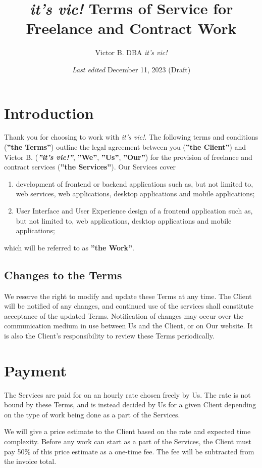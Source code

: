 \documentclass{article}
\title{\textit{it's vic!} Terms of Service for Freelance and Contract Work}
\author{Victor B. DBA \textit{it's vic!}}
\date{\textit{Last edited} December 11, 2023 (Draft)}
\begin{document}
\maketitle
\tableofcontents

\renewcommand{\labelenumi}{\alph{enumi})}

\section{Introduction}
Thank you for choosing to work with \textit{it's vic!}. The following terms and conditions (\textbf{''the Terms''}) outline the legal agreement between you (\textbf{''the Client''}) and Victor B. (\textbf{\textit{''it's vic!''}}, \textbf{''We''}, \textbf{''Us''}, \textbf{''Our''}) for the provision of freelance and contract services (\textbf{''the Services''}). Our Services cover 
\begin{enumerate}
    \item development of frontend or backend applications such as, but not limited to, web services, web applications, desktop applications and mobile applications;
    \item User Interface and User Experience design of a frontend application such as, but not limited to, web applications, desktop applications and mobile applications;
\end{enumerate}
which will be referred to as \textbf{''the Work''}.

\subsection{Changes to the Terms}
We reserve the right to modify and update these Terms at any time. The Client will be notified of any changes, and continued use of the services shall constitute acceptance of the updated Terms. Notification of changes may occur over the communication medium in use between Us and the Client, or on Our website. It is also the Client's responsibility to review these Terms periodically.

\section{Payment}
The Services are paid for on an hourly rate chosen freely by Us. The rate is not bound by these Terms, and is instead decided by Us for a given Client depending on the type of work being done as a part of the Services.

We will give a price estimate to the Client based on the rate and expected time complexity. Before any work can start as a part of the Services, the Client must pay 50\% of this price estimate as a one-time fee. The fee will be subtracted from the invoice total.
\end{document}
